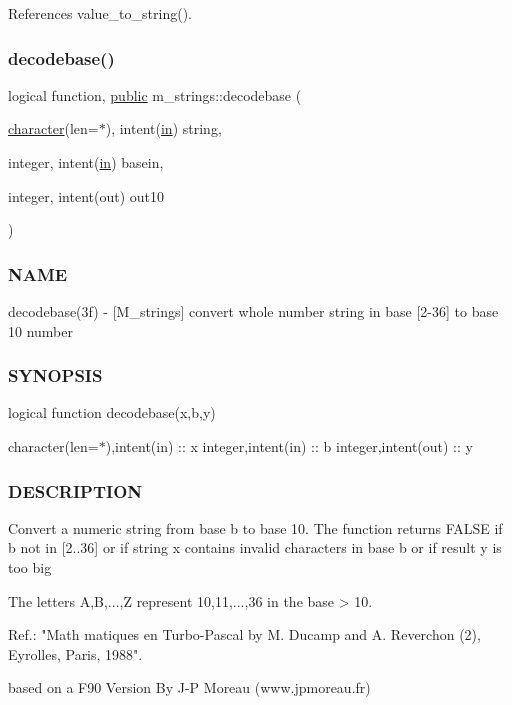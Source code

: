References value\+\_\+to\+\_\+string().

\mbox{\label{namespacem__strings_a90f3bdfa02c8ddff42cb15e66b124fe8}} 
\subsubsection{\texorpdfstring{decodebase()}{decodebase()}}
{\footnotesize\ttfamily logical function, \hyperlink{M__stopwatch_83_8txt_a2f74811300c361e53b430611a7d1769f}{public} m\+\_\+strings\+::decodebase (\begin{DoxyParamCaption}\item[{\hyperlink{option__stopwatch_83_8txt_abd4b21fbbd175834027b5224bfe97e66}{character}(len=$\ast$), intent(\hyperlink{M__journal_83_8txt_afce72651d1eed785a2132bee863b2f38}{in})}]{string,  }\item[{integer, intent(\hyperlink{M__journal_83_8txt_afce72651d1eed785a2132bee863b2f38}{in})}]{basein,  }\item[{integer, intent(out)}]{out10 }\end{DoxyParamCaption})}



\subsubsection*{N\+A\+ME}

decodebase(3f) -\/ \mbox{[}M\+\_\+strings\mbox{]} convert whole number string in base \mbox{[}2-\/36\mbox{]} to base 10 number

\subsubsection*{S\+Y\+N\+O\+P\+S\+IS}

logical function decodebase(x,b,y)

character(len=$\ast$),intent(in) \+:\+: x integer,intent(in) \+:\+: b integer,intent(out) \+:\+: y

\subsubsection*{D\+E\+S\+C\+R\+I\+P\+T\+I\+ON}

\begin{DoxyVerb}Convert a numeric string from base b to base 10. The function returns
FALSE if b not in [2..36] or if string x contains invalid
characters in base b or if result y is too big

The letters A,B,...,Z represent 10,11,...,36 in the base > 10.

   Ref.: "Math matiques en Turbo-Pascal by
          M. Ducamp and A. Reverchon (2),
          Eyrolles, Paris, 1988".

based on a F90 Version By J-P Moreau (www.jpmoreau.fr)
\end{DoxyVerb}



